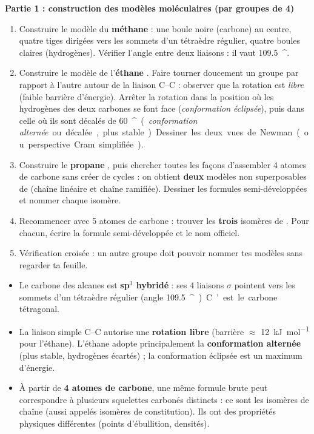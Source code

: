 \documentclass[11pt]{article}
\providecommand{\degree}{^{\circ}}
\newcommand{\cle}[1]{{\popxbold\color{popdark}#1}}
\newcounter{popsec}
\newcounter{popsub}
\newcommand{\courssub}[1]{%
  \stepcounter{popsub}%
  \par\vspace{9pt}\noindent{\popxbold\fontsize{11.5}{13}\selectfont\color{popink}{\color{poporange}\thepopsec.\thepopsub}\hspace{6pt}#1}\par\nopagebreak\vspace{4pt}
}
\begin{document}
\courssub{Protocole}

\textbf{Partie 1 : construction des modèles moléculaires (par groupes de 4)}

\begin{enumerate}
\item Construire le modèle du \textbf{méthane}  : une boule noire (carbone) au centre, quatre tiges dirigées vers les sommets d'un tétraèdre régulier, quatre boules claires (hydrogènes). Vérifier l'angle entre deux liaisons : il vaut \SI{109,5}{\degree}.
\item Construire le modèle de l'\textbf{éthane} . Faire tourner doucement un groupe  par rapport à l'autre autour de la liaison C--C : observer que la rotation est \emph{libre} (faible barrière d'énergie). Arrêter la rotation dans la position où les hydrogènes des deux carbones se font face (\emph{conformation éclipsée}), puis dans celle où ils sont décalés de \SI{60}{\degree} (\emph{conformation alternée} ou décalée, plus stable). Dessiner les deux vues de Newman (ou perspective Cram simplifiée).
\item Construire le \textbf{propane} , puis chercher toutes les façons d'assembler 4 atomes de carbone sans créer de cycles : on obtient \textbf{deux} modèles non superposables de  (chaîne linéaire et chaîne ramifiée). Dessiner les formules semi-développées et nommer chaque isomère.
\item Recommencer avec 5 atomes de carbone : trouver les \textbf{trois} isomères de . Pour chacun, écrire la formule semi-développée et le nom officiel.
\item Vérification croisée : un autre groupe doit pouvoir nommer tes modèles sans regarder ta feuille.
\end{enumerate}

\begin{aretenir}
\begin{itemize}
\item Le carbone des alcanes est \textbf{sp$^3$ hybridé} : ses 4 liaisons $\sigma$ pointent vers les sommets d'un tétraèdre régulier (angle \SI{109,5}{\degree}). C'est le \cle{carbone tétragonal}.
\item La liaison simple C--C autorise une \textbf{rotation libre} (barrière $\approx$ \SI{12}{kJ.mol^{-1}} pour l'éthane). L'éthane adopte principalement la \textbf{conformation alternée} (plus stable, hydrogènes écartés) ; la conformation éclipsée est un maximum d'énergie.
\item À partir de \textbf{4 atomes de carbone}, une même formule brute  peut correspondre à plusieurs squelettes carbonés distincts : ce sont les \cle{isomères de chaîne} (aussi appelés isomères de constitution). Ils ont des propriétés physiques différentes (points d'ébullition, densités).
\end{itemize}
\end{aretenir}
\end{document}
